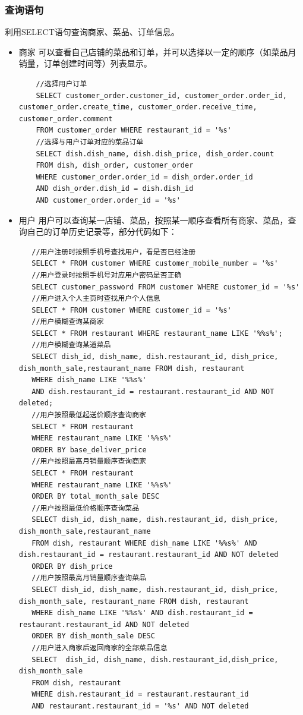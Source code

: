 \documentclass[12pt, oneside,a4paper]{article}
\begin{document}
\subsubsection{查询语句}
   利用SELECT语句查询商家、菜品、订单信息。
  \begin{itemize}
   \item 商家
     可以查看自己店铺的菜品和订单，并可以选择以一定的顺序（如菜品月销量，订单创建时间等）列表显示。
    \begin{lstlisting}
    //选择用户订单
	SELECT customer_order.customer_id, customer_order.order_id, customer_order.create_time, customer_order.receive_time, customer_order.comment
	FROM customer_order WHERE restaurant_id = '%s'
	//选择与用户订单对应的菜品订单
	SELECT dish.dish_name, dish.dish_price, dish_order.count
	FROM dish, dish_order, customer_order
	WHERE customer_order.order_id = dish_order.order_id
	AND dish_order.dish_id = dish.dish_id
	AND customer_order.order_id = '%s'
    \end{lstlisting}
   \item 用户
     用户可以查询某一店铺、菜品，按照某一顺序查看所有商家、菜品，查询自己的订单历史记录等，部分代码如下：
    \begin{lstlisting}
   //用户注册时按照手机号查找用户，看是否已经注册
   SELECT * FROM customer WHERE customer_mobile_number = '%s'
   //用户登录时按照手机号对应用户密码是否正确
   SELECT customer_password FROM customer WHERE customer_id = '%s'
   //用户进入个人主页时查找用户个人信息
   SELECT * FROM customer WHERE customer_id = '%s'
   //用户模糊查询某商家
   SELECT * FROM restaurant WHERE restaurant_name LIKE '%%s%';
   //用户模糊查询某道菜品
   SELECT dish_id, dish_name, dish.restaurant_id, dish_price, dish_month_sale,restaurant_name FROM dish, restaurant
   WHERE dish_name LIKE '%%s%'
   AND dish.restaurant_id = restaurant.restaurant_id AND NOT deleted;
   //用户按照最低起送价顺序查询商家
   SELECT * FROM restaurant
   WHERE restaurant_name LIKE '%%s%'
   ORDER BY base_deliver_price
   //用户按照最高月销量顺序查询商家
   SELECT * FROM restaurant
   WHERE restaurant_name LIKE '%%s%'
   ORDER BY total_month_sale DESC
   //用户按照最低价格顺序查询菜品
   SELECT dish_id, dish_name, dish.restaurant_id, dish_price, dish_month_sale,restaurant_name
   FROM dish, restaurant WHERE dish_name LIKE '%%s%' AND dish.restaurant_id = restaurant.restaurant_id AND NOT deleted
   ORDER BY dish_price
   //用户按照最高月销量顺序查询菜品
   SELECT dish_id, dish_name, dish.restaurant_id, dish_price, dish_month_sale, restaurant_name FROM dish, restaurant
   WHERE dish_name LIKE '%%s%' AND dish.restaurant_id = restaurant.restaurant_id AND NOT deleted
   ORDER BY dish_month_sale DESC
   //用户进入商家后返回商家的全部菜品信息
   SELECT  dish_id, dish_name, dish.restaurant_id,dish_price, dish_month_sale
   FROM dish, restaurant
   WHERE dish.restaurant_id = restaurant.restaurant_id
   AND restaurant.restaurant_id = '%s' AND NOT deleted
    \end{lstlisting}
  \end{itemize}
\end{document}
